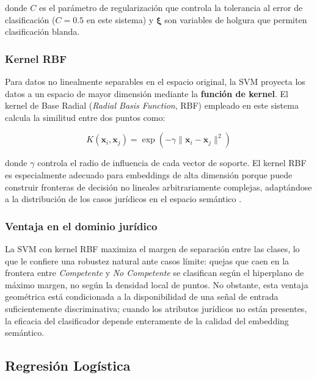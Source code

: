 donde $C$ es el parámetro de regularización que controla la tolerancia al error
de clasificación ($C = 0.5$ en este sistema) y $\boldsymbol{\xi}$ son variables
de holgura que permiten clasificación blanda.

\subsubsection*{Kernel RBF}

Para datos no linealmente separables en el espacio original, la SVM proyecta
los datos a un espacio de mayor dimensión mediante la \textbf{función de kernel}.
El kernel de Base Radial (\textit{Radial Basis Function}, RBF) empleado en este
sistema calcula la similitud entre dos puntos como:

\begin{equation}
  K(\mathbf{x}_i, \mathbf{x}_j)
  = \exp\!\left(-\gamma \|\mathbf{x}_i - \mathbf{x}_j\|^2\right)
  \label{eq:rbf}
\end{equation}

donde $\gamma$ controla el radio de influencia de cada vector de soporte. El
kernel RBF es especialmente adecuado para embeddings de alta dimensión porque
puede construir fronteras de decisión no lineales arbitrariamente complejas,
adaptándose a la distribución de los casos jurídicos en el espacio semántico \cite{cortes1995}.

\subsubsection*{Ventaja en el dominio jurídico}

La SVM con kernel RBF maximiza el margen de separación entre las clases, lo
que le confiere una robustez natural ante casos límite: quejas que caen en la
frontera entre \textit{Competente} y \textit{No Competente} se clasifican
según el hiperplano de máximo margen, no según la densidad local de puntos.
No obstante, esta ventaja geométrica está condicionada a la disponibilidad de
una señal de entrada suficientemente discriminativa; cuando los atributos
jurídicos no están presentes, la eficacia del clasificador depende enteramente
de la calidad del embedding semántico.

\subsection{Regresión Logística}

